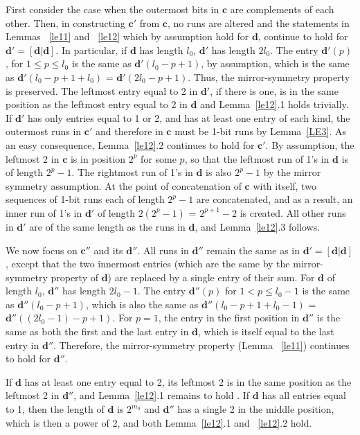 First consider the case when the outermost bits in $\mathbf{c}$
are complements of each other. Then, in constructing $\mathbf{c'}$
from $\mathbf{c}$, no runs are altered and the statements in
Lemmas ~\ref{le11} and ~\ref{le12} which by assumption hold for
$\mathbf{d}$, continue to hold for $\mathbf{d'}=[\mathbf{d}|
\mathbf{d}]$. In particular, if $\mathbf{d}$ has length $l_0$,
$\mathbf{d'}$ has length $2l_0$. The entry $\mathbf{d'}(p)$, for
$1\leq p \leq l_0$ is the same as $\mathbf{d'}(l_0-p+1)$, by
assumption, which is the same as $\mathbf{d'}(l_0-p+1+l_0)$ =
$\mathbf{d'}(2l_0-p+1)$. Thus, the mirror-symmetry property is
preserved. The leftmost entry equal to 2 in $\mathbf{d'}$, if
there is one, is in the same position as the leftmost entry equal
to 2 in $\mathbf{d}$ and Lemma~\ref{le12}.1 holds trivially. If
$\mathbf{d'}$ has only entries equal to 1 or 2, and has at least
one entry of each kind, the outermost runs in $\mathbf{c'}$ and
therefore in $\mathbf{c}$ must be 1-bit runs by Lemma~\ref{LE3}.
As an easy consequence, Lemma~\ref{le12}.2 continues to hold for
$\mathbf{c'}$. By assumption, the leftmost 2 in $\mathbf{c}$ is in
position $2^p$ for some $p$, so that the leftmost run of 1's in
$\mathbf{d}$ is of length $2^p-1$. The rightmost run of 1's in
$\mathbf{d}$ is also $2^p-1$ by the mirror symmetry assumption. At
the point of concatenation of $\mathbf{c}$ with itself, two
sequences of 1-bit runs each of length $2^p-1$ are concatenated,
and as a result, an inner run of 1's in $\mathbf{d'}$ of length
$2(2^p-1)$ = $2^{p+1}-2$ is created. All other runs in
$\mathbf{d'}$ are of the same length as the runs in $\mathbf{d}$,
and Lemma~\ref{le12}.3 follows.

We now focus on $\mathbf{c''}$ and its $\mathbf{d''}$. All runs in
$\mathbf{d''}$ remain the same as in
$\mathbf{d'}=[\mathbf{d}|\mathbf{d}]$, except that the two
innermost entries (which are the same by the mirror-symmetry
property of $\mathbf{d}$) are replaced by a single entry of their
sum. For $\mathbf{d}$ of length $l_0$, $\mathbf{d''}$ has length
$2l_0-1$. The entry $\mathbf{d''}(p)$ for $1 < p \leq l_0-1$ is
the same as $\mathbf{d''}(l_0-p+1)$, which is also the same as
$\mathbf{d''}(l_0-p+1+l_0-1)$ = $\mathbf{d''}((2l_0-1)-p+1)$. For
$p=1$, the entry in the first position in $\mathbf{d''}$ is the
same as both the first and the last entry in $\mathbf{d}$, which
is itself equal to the last entry in $\mathbf{d''}$. Therefore,
the mirror-symmetry property (Lemma ~\ref{le11}) continues to hold
for $\mathbf{d''}$.

If $\mathbf{d}$ has at least one entry equal to 2, its leftmost 2
is in the same position as the leftmost 2 in $\mathbf{d''}$, and
Lemma~\ref{le12}.1 remains to hold . If $\mathbf{d}$ has all
entries equal to 1, then the length of $\mathbf{d}$ is $2^{m_0}$
and $\mathbf{d''}$ has a single 2 in the middle position, which is
then a power of 2, and both Lemma~\ref{le12}.1 and ~\ref{le12}.2
hold.

